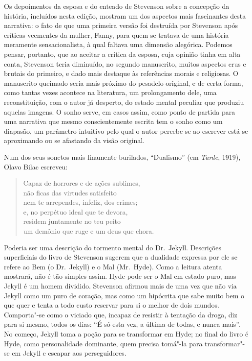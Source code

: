 Os depoimentos da esposa e do enteado de Stevenson sobre a concepção da
história, incluídos nesta edição, mostram um dos aspectos mais
fascinantes desta narrativa: o fato de que uma primeira versão foi
destruída por Stevenson após críticas veementes da mulher, Fanny, para
quem se tratava de uma história meramente sensacionalista, à qual
faltava uma dimensão alegórica.  Podemos pensar, portanto, que ao
aceitar a crítica da esposa, cuja opinião tinha em alta conta,
Stevenson teria diminuído, no segundo manuscrito, muitos aspectos crus
e brutais do primeiro, e dado mais destaque às referências morais e
religiosas.  O manuscrito queimado seria mais próximo do pesadelo
original, e de certa forma, como tantas vezes acontece na literatura,
um prolongamento dele, uma reconstituição, com o autor já desperto, do
estado mental peculiar que produziu aquelas imagens.  O sonho serve, em
casos assim, como ponto de partida para uma narrativa que mesmo
conscientemente escrita tem o sonho como um diapasão, um parâmetro
intuitivo pelo qual o autor percebe se ao escrever está se aproximando
ou se afastando da visão original.

Num dos seus sonetos mais finamente burilados, “Dualismo” (em
\textit{Tarde}, 1919), Olavo Bilac escreveu:


\begin{verse}
Capaz de horrores e de ações sublimes,\\
não ficas das virtudes satisfeito\\
nem te arrependes, infeliz, dos crimes;\\
e, no perpétuo ideal que te devora,\\
residem juntamente no teu peito\\
um demônio que ruge e um deus que chora.
\end{verse}

Poderia ser uma descrição do tormento mental do Dr.~Jekyll.  Descrições
superficiais do livro de Stevenson sugerem que a dualidade expressa por
ele se refere ao Bem (o Dr.~Jekyll) e o Mal (Mr.~Hyde).  Como a leitura
atenta mostrará, não é tão simples assim.  Hyde pode ser o Mal em
estado puro, mas Jekyll é um homem dividido.  Stevenson afirmou mais de
uma vez que não via Jekyll como um puro de coração, mas como um
hipócrita que sabe muito bem o que quer e tenta a todo custo reservar
para si o melhor de dois mundos.  Comporta"-se como o viciado que,
incapaz de resistir à tentação da droga, diz para si mesmo, todos os
dias: “É só esta vez, a última de todas, e nunca mais”.  No começo,
Jekyll toma a poção para se transformar em Hyde; no final do livro é
Hyde, como personalidade dominante, quem precisa tomá"-la para
transformar"-se em Jekyll e escapar aos perseguidores. 

